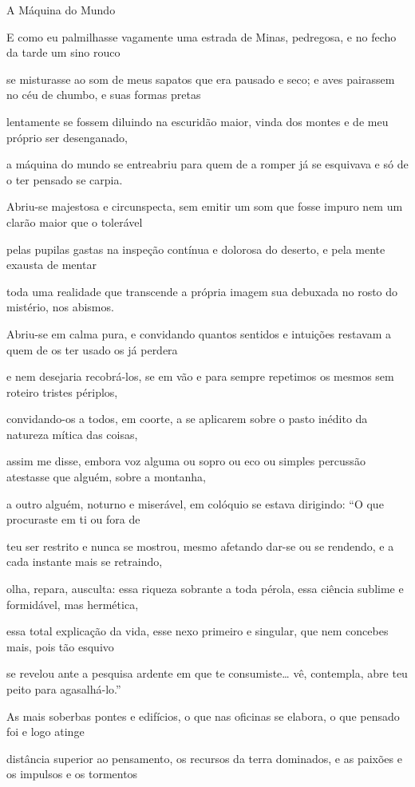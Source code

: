A Máquina do Mundo

E como eu palmilhasse vagamente
uma estrada de Minas, pedregosa,
e no fecho da tarde um sino rouco
 
se misturasse ao som de meus sapatos
que era pausado e seco; e aves pairassem
no céu de chumbo, e suas formas pretas
 
lentamente se fossem diluindo
na escuridão maior, vinda dos montes
e de meu próprio ser desenganado,
 
a máquina do mundo se entreabriu
para quem de a romper já se esquivava
e só de o ter pensado se carpia.
 
Abriu-se majestosa e circunspecta,
sem emitir um som que fosse impuro
nem um clarão maior que o tolerável
 
pelas pupilas gastas na inspeção
contínua e dolorosa do deserto,
e pela mente exausta de mentar
 
toda uma realidade que transcende
a própria imagem sua debuxada
no rosto do mistério, nos abismos.
 
Abriu-se em calma pura, e convidando
quantos sentidos e intuições restavam
a quem de os ter usado os já perdera
 
e nem desejaria recobrá-los,
se em vão e para sempre repetimos
os mesmos sem roteiro tristes périplos,
 
convidando-os a todos, em coorte,
a se aplicarem sobre o pasto inédito
da natureza mítica das coisas,
 
assim me disse, embora voz alguma
ou sopro ou eco ou simples percussão
atestasse que alguém, sobre a montanha,
 
a outro alguém, noturno e miserável,
em colóquio se estava dirigindo:
“O que procuraste em ti ou fora de
 
teu ser restrito e nunca se mostrou,
mesmo afetando dar-se ou se rendendo,
e a cada instante mais se retraindo,
 
olha, repara, ausculta: essa riqueza
sobrante a toda pérola, essa ciência
sublime e formidável, mas hermética,
 
essa total explicação da vida,
esse nexo primeiro e singular,
que nem concebes mais, pois tão esquivo
 
se revelou ante a pesquisa ardente
em que te consumiste… vê, contempla,
abre teu peito para agasalhá-lo.”
 
As mais soberbas pontes e edifícios,
o que nas oficinas se elabora,
o que pensado foi e logo atinge
 
distância superior ao pensamento,
os recursos da terra dominados,
e as paixões e os impulsos e os tormentos
 
